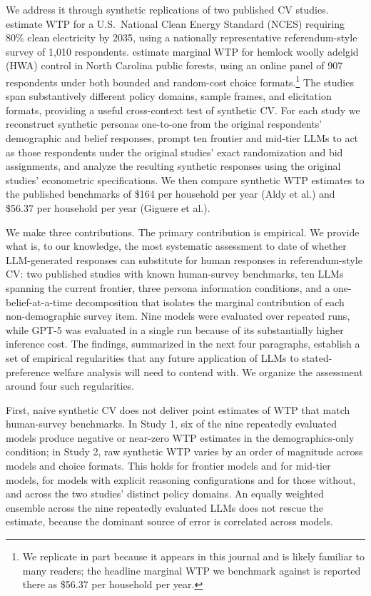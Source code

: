 \documentclass[12pt]{article}
\begin{document}
We address it through synthetic replications of two published CV studies.
\textcite{Aldy2012} estimate WTP for a U.S.\ National Clean Energy Standard
(NCES) requiring 80\% clean electricity by 2035, using a nationally
representative referendum-style survey of 1{,}010 respondents.
\textcite{Giguere2020} estimate marginal WTP for hemlock woolly adelgid
(HWA) control in North Carolina public forests, using an online panel of
907 respondents under both bounded and random-cost choice formats.\footnote{We
replicate \textcite{Giguere2020} in part because it appears in this journal
and is likely familiar to many readers; the headline marginal WTP we
benchmark against is reported there as \$56.37 per household per year.}
The studies span substantively different policy domains, sample frames, and
elicitation formats, providing a useful cross-context test of synthetic CV.
For each study we reconstruct synthetic personas one-to-one from the
original respondents' demographic and belief responses, prompt ten frontier
and mid-tier LLMs to act as those respondents under the original studies'
exact randomization and bid assignments, and analyze the resulting synthetic
responses using the original studies' econometric specifications. We then
compare synthetic WTP estimates to the published benchmarks of \$164 per
household per year (Aldy et al.) and \$56.37 per household per year (Giguere
et al.).

We make three contributions. The primary contribution is empirical. We
provide what is, to our knowledge, the most systematic assessment to date
of whether LLM-generated responses can substitute for human responses in
referendum-style CV: two published studies with known human-survey
benchmarks, ten LLMs spanning the current frontier, three persona
information conditions, and a one-belief-at-a-time decomposition that
isolates the marginal contribution of each non-demographic survey item.
Nine models were evaluated over repeated runs, while GPT-5 was evaluated
in a single run because of its substantially higher inference cost.
The findings, summarized in the next four paragraphs, establish a set of
empirical regularities that any future application of LLMs to
stated-preference welfare analysis will need to contend with. We organize
the assessment around four such regularities.

First, naive synthetic CV does not deliver point estimates of WTP that
match human-survey benchmarks. In Study 1, six of the nine repeatedly
evaluated models produce negative or near-zero WTP estimates in the
demographics-only condition; in Study 2, raw synthetic WTP varies by an
order of magnitude across models and choice formats. This holds for
frontier models and for mid-tier models, for models with explicit reasoning
configurations and for those without, and across the two studies' distinct
policy domains. An equally weighted ensemble across the nine repeatedly
evaluated LLMs does not rescue the estimate, because the dominant source
of error is correlated across models.
\end{document}
